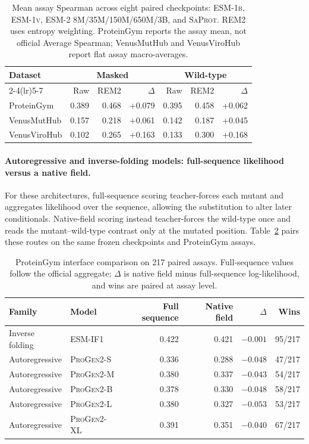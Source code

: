 \documentclass{article} %
\begin{document}
\begin{table}[!ht]
\caption{Mean assay Spearman across eight paired checkpoints: \textsc{ESM-1b}, \textsc{ESM-1v}, \textsc{ESM-2} 8M/35M/150M/650M/3B, and \textsc{SaProt}. \textsc{REM2} uses entropy weighting. ProteinGym reports the assay mean, not official Average Spearman; VenusMutHub and VenusViroHub report flat assay macro-averages.}
\label{tab:mask_wt}
\centering
\small
\setlength{\tabcolsep}{7pt}
\begin{tabular}{lrrrrrr}
\toprule
Dataset & \multicolumn{3}{c}{Masked} & \multicolumn{3}{c}{Wild-type} \\
\cmidrule(lr){2-4}\cmidrule(lr){5-7}
& Raw & \textsc{REM2} & $\Delta$ & Raw & \textsc{REM2} & $\Delta$ \\
\midrule
ProteinGym & 0.389 & 0.468 & +0.079 & 0.395 & 0.458 & +0.062 \\
VenusMutHub & 0.157 & 0.218 & +0.061 & 0.142 & 0.187 & +0.045 \\
VenusViroHub & 0.102 & 0.265 & +0.163 & 0.133 & 0.300 & +0.168 \\
\bottomrule
\end{tabular}
\end{table}

\paragraph{Autoregressive and inverse-folding models: full-sequence likelihood versus a native field.}
For these architectures, full-sequence scoring teacher-forces each mutant and aggregates likelihood over the sequence, allowing the substitution to alter later conditionals. Native-field scoring instead teacher-forces the wild-type once and reads the mutant--wild-type contrast only at the mutated position. Table~\ref{tab:sequence_native_interfaces} pairs these routes on the same frozen checkpoints and ProteinGym assays.

\begin{table}[!ht]
\caption{ProteinGym interface comparison on 217 paired assays. Full-sequence values follow the official aggregate; $\Delta$ is native field minus full-sequence log-likelihood, and wins are paired at assay level.}
\label{tab:sequence_native_interfaces}
\centering
\small
\setlength{\tabcolsep}{6pt}
\begin{tabular}{llrrrr}
\toprule
Family & Model & Full sequence & Native field & $\Delta$ & Wins \\
\midrule
Inverse folding & \textsc{ESM-IF1} & 0.422 & 0.421 & $-0.001$ & 95/217 \\
Autoregressive & \textsc{ProGen2}-S & 0.336 & 0.288 & $-0.048$ & 47/217 \\
Autoregressive & \textsc{ProGen2}-M & 0.380 & 0.337 & $-0.043$ & 54/217 \\
Autoregressive & \textsc{ProGen2}-B & 0.378 & 0.330 & $-0.048$ & 58/217 \\
Autoregressive & \textsc{ProGen2}-L & 0.380 & 0.327 & $-0.053$ & 53/217 \\
Autoregressive & \textsc{ProGen2}-XL & 0.391 & 0.351 & $-0.040$ & 67/217 \\
\bottomrule
\end{tabular}
\end{table}
\end{document}
